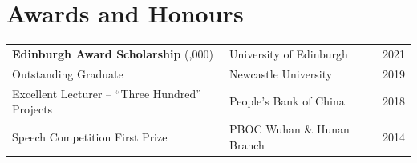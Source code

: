 \section{Awards and Honours}
\begin{tabularx}{\linewidth}{@{}l X r@{}}
\textbf{Edinburgh Award Scholarship} (\textsterling30,000) & University of Edinburgh & 2021 \\
Outstanding Graduate & Newcastle University & 2019 \\
Excellent Lecturer -- ``Three Hundred'' Projects & People's Bank of China & 2018 \\
Speech Competition First Prize & PBOC Wuhan \& Hunan Branch & 2014 \\
\end{tabularx}
